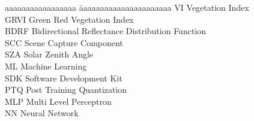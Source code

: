 
\newcommand{\abbrev}[2]{#1 \> #2\\ }
\begin{abbreviations}

\begin{tabbing}
  aaaaaaaaaaaaaaaaa \= aaaaaaaaaaaaaaaaaaaaaa\kill
  \abbrev{VI}{Vegetation Index}
  \abbrev{GRVI}{Green Red Vegetation Index}
  \abbrev{BDRF}{Bidirectional Reflectance Distribution Function}
  \abbrev{SCC}{Scene Capture Component}
  \abbrev{SZA}{Solar Zenith Angle}
  \abbrev{ML}{Machine Learning}
  \abbrev{SDK}{Software Development Kit}
  \abbrev{PTQ}{Post Training Quantization}
  \abbrev{MLP}{Multi Level Perceptron}
  \abbrev{NN}{Neural Network}
\end{tabbing}
\end{abbreviations}
